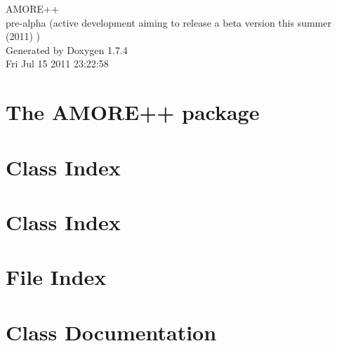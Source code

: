 \documentclass[a4paper]{book}
\begin{document}
\hypersetup{pageanchor=false}
\begin{titlepage}
\vspace*{7cm}
\begin{center}
{\Large AMORE++ \\[1ex]\large pre-\/alpha (active development aiming to release a beta version this summer (2011) ) }\\
\vspace*{1cm}
{\large Generated by Doxygen 1.7.4}\\
\vspace*{0.5cm}
{\small Fri Jul 15 2011 23:22:58}\\
\end{center}
\end{titlepage}
\clearemptydoublepage
{}
\tableofcontents
\clearemptydoublepage
{}
\hypersetup{pageanchor=true}
\chapter{The AMORE++ package}
\label{index}\hypertarget{index}{}
\chapter{Class Index}

\chapter{Class Index}

\chapter{File Index}

\chapter{Class Documentation}






















\end{document}
